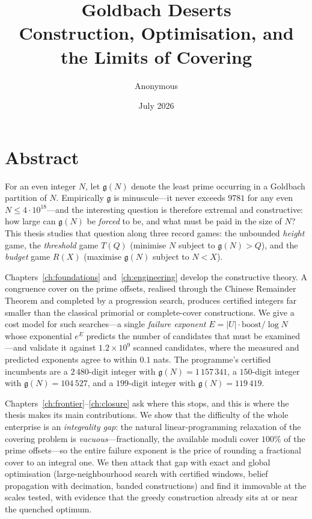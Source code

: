 \documentclass[11pt,oneside]{book}
\title{\bf Goldbach Deserts\\[4pt]
\large Construction, Optimisation, and the Limits of Covering}
\author{Anonymous}
\date{July 2026}
\theoremstyle{plain}
\theoremstyle{definition}
\theoremstyle{remark}
\newcommand{\N}{N}
\newcommand{\g}{\mathfrak{g}}
\begin{document}
\frontmatter
\maketitle

\chapter*{Abstract}

For an even integer $\N$, let $\g(\N)$ denote the least prime occurring in a
Goldbach partition of $\N$. Empirically $\g$ is minuscule---it never exceeds
$9781$ for any even $\N\le4\cdot10^{18}$---and the interesting question is
therefore extremal and constructive: how large can $\g(\N)$ be \emph{forced}
to be, and what must be paid in the size of $\N$? This thesis studies that
question along three record games: the unbounded \emph{height} game, the
\emph{threshold} game $T(Q)$ (minimise $\N$ subject to $\g(\N)>Q$), and the
\emph{budget} game $R(X)$ (maximise $\g(\N)$ subject to $\N<X$).

Chapters~\ref{ch:foundations} and~\ref{ch:engineering} develop the
constructive theory. A congruence cover on the prime offsets, realised
through the Chinese Remainder Theorem and completed by a progression search,
produces certified integers far smaller than the classical primorial or
complete-cover constructions. We give a cost model for such searches---a
single \emph{failure exponent} $E=|U|\cdot\mathrm{boost}/\log\N$ whose
exponential $e^{E}$ predicts the number of candidates that must be
examined---and validate it against $1.2\times10^{9}$ scanned candidates, where
the measured and predicted exponents agree to within $0.1$ nats. The
programme's certified incumbents are a $2\,480$-digit integer with
$\g(\N)=1\,157\,341$, a $150$-digit integer with $\g(\N)=104\,527$, and a
$199$-digit integer with $\g(\N)=119\,419$.

Chapters~\ref{ch:frontier}--\ref{ch:closure} ask where this stops, and this
is where the thesis makes its main contributions. We show that the difficulty
of the whole enterprise is an \emph{integrality gap}: the natural
linear-programming relaxation of the covering problem is
\emph{vacuous}---fractionally, the available moduli cover $100\%$ of the prime
offsets---so the entire failure exponent is the price of rounding a fractional
cover to an integral one. We then attack that gap with exact and global
optimisation (large-neighbourhood search with certified windows, belief
propagation with decimation, banded constructions) and find it immovable at
the scales tested, with evidence that the greedy construction already sits at
or near the quenched optimum.
\end{document}
